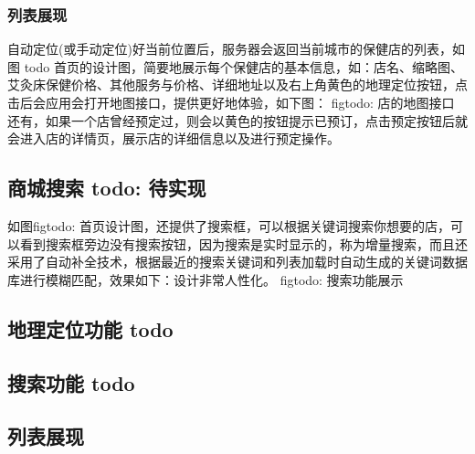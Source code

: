 \documentclass[UTF8]{ctexbook}
\begin{document}
      \subsubsection{列表展现}
        \label{subsubsec:列表展现}
        自动定位(或手动定位)好当前位置后，服务器会返回当前城市的保健店的列表，如图 todo 首页的设计图，简要地展示每个保健店的基本信息，如：店名、缩略图、艾灸床保健价格、其他服务与价格、详细地址以及右上角黄色的地理定位按钮，点击后会应用会打开地图接口，提供更好地体验，如下图：
        figtodo: 店的地图接口
        还有，如果一个店曾经预定过，则会以黄色的按钮提示已预订，点击预定按钮后就会进入店的详情页，展示店的详细信息以及进行预定操作。

      \subsection{商城搜索 todo: 待实现}
        \label{subsec:商城搜索_todo_待实现}
        如图figtodo: 首页设计图，还提供了搜索框，可以根据关键词搜索你想要的店，可以看到搜索框旁边没有搜索按钮，因为搜索是实时显示的，称为增量搜索，而且还采用了自动补全技术，根据最近的搜索关键词和列表加载时自动生成的关键词数据库进行模糊匹配，效果如下：设计非常人性化。
        figtodo: 搜索功能展示

    \subsection{地理定位功能 todo}
      \label{subsec:地理定位功能_todo}

    \subsection{搜索功能 todo}
      \label{subsec:搜索功能_todo}

    \subsection{列表展现}
      \label{subsec:列表展现}
\end{document}
